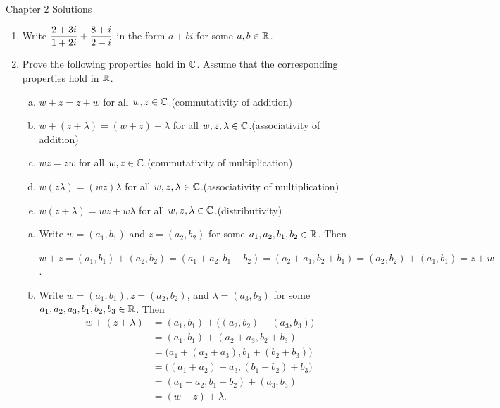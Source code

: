 \documentclass[11pt,fleqn,dvipsnames,usenames]{article}
\renewcommand{\headrulewidth}{1pt}
\begin{document}
\fancyhead[L]{\course}
\fancyhead[R]{\term}
\renewcommand{\headrulewidth}{0.4pt}

{\huge Chapter 2 Solutions}
\vsp

\begin{enumerate}
\item Write $\displaystyle{\frac{2 + 3i}{1 + 2i} + \frac{8+i}{2-i}}$ in the form $a+bi$ for some $a,b\in\mathbb{R}$.
\item Prove the following properties hold in $\mathbb{C}$.  Assume that the corresponding properties hold in $\mathbb{R}$.
\begin{enumerate}[(a)]
\item $w + z = z + w$ for all $w,z\in\mathbb{C}$.\hfill (commutativity of addition)
\item $w + (z + \lambda) = (w + z) + \lambda$ for all $w,z,\lambda\in\mathbb{C}$.\hfill (associativity of addition)
\item $wz = zw$ for all $w,z\in\mathbb{C}$.\hfill (commutativity of multiplication)
\item $w(z\lambda) = (wz)\lambda$ for all $w,z,\lambda\in\mathbb{C}$.\hfill (associativity of multiplication)
\item $w(z + \lambda) = wz + w\lambda$ for all $w,z,\lambda\in\mathbb{C}$.\hfill (distributivity)
\end{enumerate}
\vsmsp

\solution 
\begin{enumerate}[(a)]
\item Write $w = (a_{1},b_{1})$ and $z = (a_{2},b_{2})$ for some $a_{1},a_{2},b_{1},b_{2}\in\mathbb{R}$.  Then
\begin{center}
$w + z = (a_{1},b_{1}) + (a_{2},b_{2}) = (a_{1} + a_{2}, b_{1} + b_{2}) = (a_{2} + a_{1}, b_{2} + b_{1}) = (a_{2},b_{2}) + (a_{1},b_{1}) = z + w$.
\end{center}

\item Write $w = (a_{1},b_{1}), z = (a_{2},b_{2})$, and $\lambda = (a_{3},b_{3})$ for some $a_{1},a_{2},a_{3},b_{1},b_{2},b_{3}\in\mathbb{R}$.  Then
\begin{align*}
w + (z + \lambda) &= (a_{1},b_{1}) + \big((a_{2},b_{2}) + (a_{3},b_{3})\big)\\
&= (a_{1},b_{1}) + (a_{2} + a_{3},b_{2}+b_{3})\\
&= \big(a_{1} + (a_{2} + a_{3}), b_{1} + (b_{2}+b_{3})\big)\\
&= \big((a_{1} + a_{2}) + a_{3}, (b_{1} + b_{2})+b_{3}\big)\\
&= (a_{1} + a_{2}, b_{1} + b_{2}) + (a_{3},b_{3})\\
&= (w + z) + \lambda.
\end{align*}


\end{enumerate}
\end{enumerate}
\end{document}

